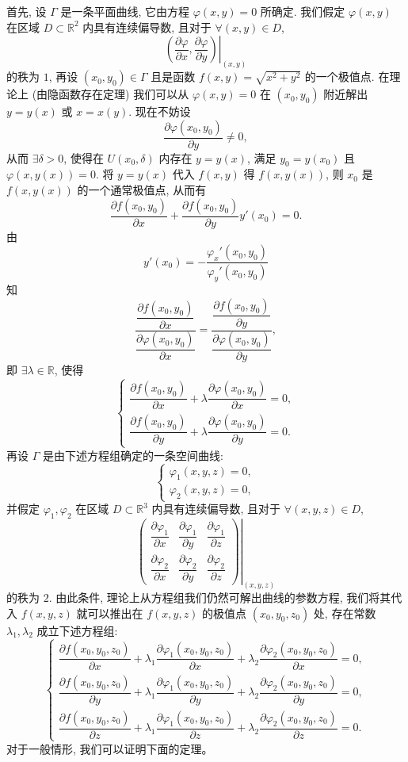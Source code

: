 \documentclass[UTF8,12pt,a4paper,fontset=fandol]{ctexart}
\begin{document}
首先, 设 $\Gamma$ 是一条平面曲线, 它由方程 $\varphi(x,y)=0$ 所确定. 我们假定 $\varphi(x,y)$ 在区域 $D\subset\mathbb R^2$ 内具有连续偏导数, 且对于 $\forall(x,y)\in D$,
\[
  \left.
  \left(\frac{\partial\varphi}{\partial x},\frac{\partial\varphi}{\partial y}\right)
  \right|_{(x,y)}
\]
的秩为 $1$, 再设 $(x_0,y_0)\in\Gamma$ 且是函数 $f(x,y)=\sqrt{x^2+y^2}$ 的一个极值点. 在理论上 (由隐函数存在定理) 我们可以从 $\varphi(x,y)=0$ 在 $(x_0,y_0)$ 附近解出 $y=y(x)$ 或 $x=x(y)$. 现在不妨设
\[
  \frac{\partial\varphi(x_0,y_0)}{\partial y}\ne0,
\]
从而 $\exists\delta>0$, 使得在 $U(x_0,\delta)$ 内存在 $y=y(x)$, 满足 $y_0=y(x_0)$ 且 $\varphi(x,y(x))=0$. 将 $y=y(x)$ 代入 $f(x,y)$ 得 $f(x,y(x))$, 则 $x_0$ 是 $f(x,y(x))$ 的一个通常极值点, 从而有
\[
  \frac{\partial f(x_0,y_0)}{\partial x}
  +
  \frac{\partial f(x_0,y_0)}{\partial y}y'(x_0)=0.
\]
由
\[
  y'(x_0)=-\frac{\varphi_x'(x_0,y_0)}{\varphi_y'(x_0,y_0)}
\]
知
\[
  \frac{\dfrac{\partial f(x_0,y_0)}{\partial x}}
       {\dfrac{\partial\varphi(x_0,y_0)}{\partial x}}
  =
  \frac{\dfrac{\partial f(x_0,y_0)}{\partial y}}
       {\dfrac{\partial\varphi(x_0,y_0)}{\partial y}},
\]
即 $\exists\lambda\in\mathbb R$, 使得
\[
  \begin{cases}
    \dfrac{\partial f(x_0,y_0)}{\partial x}
    +\lambda\dfrac{\partial\varphi(x_0,y_0)}{\partial x}=0,\\[1.2ex]
    \dfrac{\partial f(x_0,y_0)}{\partial y}
    +\lambda\dfrac{\partial\varphi(x_0,y_0)}{\partial y}=0.
  \end{cases}
\]
再设 $\Gamma$ 是由下述方程组确定的一条空间曲线:
\[
  \begin{cases}
    \varphi_1(x,y,z)=0,\\
    \varphi_2(x,y,z)=0,
  \end{cases}
\]
并假定 $\varphi_1,\varphi_2$ 在区域 $D\subset\mathbb R^3$ 内具有连续偏导数, 且对于 $\forall(x,y,z)\in D$,
\[
  \left.
  \begin{pmatrix}
    \dfrac{\partial\varphi_1}{\partial x} &
    \dfrac{\partial\varphi_1}{\partial y} &
    \dfrac{\partial\varphi_1}{\partial z}\\
    \dfrac{\partial\varphi_2}{\partial x} &
    \dfrac{\partial\varphi_2}{\partial y} &
    \dfrac{\partial\varphi_2}{\partial z}
  \end{pmatrix}
  \right|_{(x,y,z)}
\]
的秩为 $2$. 由此条件, 理论上从方程组我们仍然可解出曲线的参数方程, 我们将其代入 $f(x,y,z)$ 就可以推出在 $f(x,y,z)$ 的极值点 $(x_0,y_0,z_0)$ 处, 存在常数 $\lambda_1,\lambda_2$ 成立下述方程组:
\[
  \begin{cases}
    \dfrac{\partial f(x_0,y_0,z_0)}{\partial x}
    +\lambda_1\dfrac{\partial\varphi_1(x_0,y_0,z_0)}{\partial x}
    +\lambda_2\dfrac{\partial\varphi_2(x_0,y_0,z_0)}{\partial x}=0,\\[1.2ex]
    \dfrac{\partial f(x_0,y_0,z_0)}{\partial y}
    +\lambda_1\dfrac{\partial\varphi_1(x_0,y_0,z_0)}{\partial y}
    +\lambda_2\dfrac{\partial\varphi_2(x_0,y_0,z_0)}{\partial y}=0,\\[1.2ex]
    \dfrac{\partial f(x_0,y_0,z_0)}{\partial z}
    +\lambda_1\dfrac{\partial\varphi_1(x_0,y_0,z_0)}{\partial z}
    +\lambda_2\dfrac{\partial\varphi_2(x_0,y_0,z_0)}{\partial z}=0.
  \end{cases}
\]
对于一般情形, 我们可以证明下面的定理。
\end{document}
